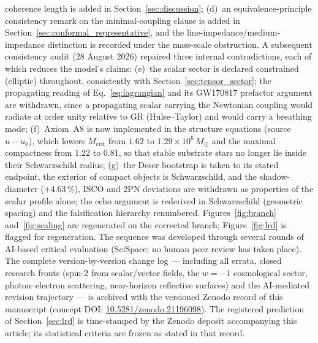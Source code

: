 \documentclass[11pt,a4paper]{article}
\theoremstyle{plain}
\theoremstyle{remark}
\begin{document}
coherence length is added in Section~\ref{sec:discussion}; (d)~an equivalence-principle consistency remark on the minimal-coupling clause is added in Section~\ref{sec:conformal_representative}, and the line-impedance/medium-impedance distinction is recorded under the mass-scale obstruction. A subsequent consistency audit (28 August 2026) repaired three internal contradictions, each of which reduces the model's claims: (e)~the scalar sector is declared constrained (elliptic) throughout, consistently with Section~\ref{sec:tensor_sector}; the propagating reading of Eq.~\eqref{eq:lagrangian} and its GW170817 prefactor argument are withdrawn, since a propagating scalar carrying the Newtonian coupling would radiate at order unity relative to GR (Hulse--Taylor) and would carry a breathing mode; (f)~Axiom~A8 is now implemented in the structure equations (source $u - u_0$), which lowers $M_{\text{crit}}$ from $1.62$ to $1.29\times10^{6}\,M_\odot$ and the maximal compactness from $1.22$ to $0.81$, so that stable substrate stars no longer lie inside their Schwarzschild radius; (g)~the Deser bootstrap is taken to its stated endpoint, the exterior of compact objects is Schwarzschild, and the shadow-diameter ($+4.63\,\%$), ISCO and 2PN deviations are withdrawn as properties of the scalar profile alone; the echo argument is rederived in Schwarzschild (geometric spacing) and the falsification hierarchy renumbered. Figures~\ref{fig:branch} and~\ref{fig:scaling} are regenerated on the corrected branch; Figure~\ref{fig:lrd} is flagged for regeneration. The sequence was developed through several rounds of AI-based critical evaluation (SciSpace; no human peer review has taken place). The complete version-by-version change log --- including all errata, closed research fronts (spin-2 from scalar/vector fields, the $w=-1$ cosmological sector, photon--electron scattering, near-horizon reflective surfaces) and the AI-mediated revision trajectory --- is archived with the versioned Zenodo record of this manuscript (concept DOI: \href{https://doi.org/10.5281/zenodo.21196098}{10.5281/zenodo.21196098}). The registered prediction of Section~\ref{sec:lrd} is time-stamped by the Zenodo deposit accompanying this article; its statistical criteria are frozen as stated in that record.

\end{document}
